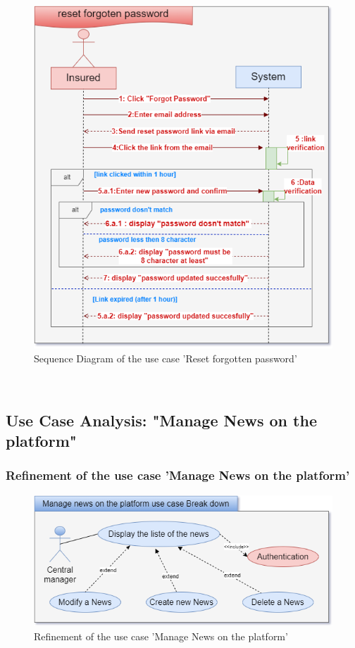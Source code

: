 \begin{figure}[h]
    \centering
    \includegraphics[width=1\textwidth]{figures/seq reset my forgoten password.png}
    \caption{Sequence Diagram of the use case 'Reset forgotten password'}
\end{figure}\
\clearpage

\subsection{Use Case Analysis: "Manage News on the platform"}
\subsubsection{Refinement of the use case 'Manage News on the platform'}
\begin{figure}[h]
    \centering
    \includegraphics[width=1\textwidth]{figures/seq manages News-break down.png}
    \caption{Refinement of the use case 'Manage News on the platform'}
\end{figure}\
